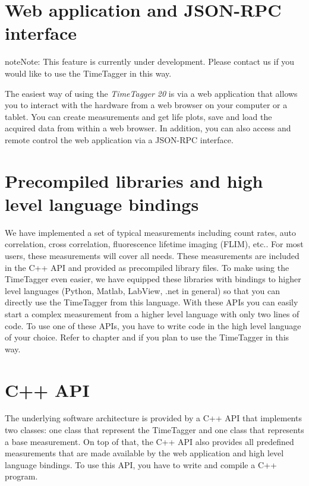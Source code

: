 \documentclass[letterpaper,10pt,english]{sphinxmanual}
\begin{document}
\section{Web application and JSON-RPC interface}
\label{sections/software:web-application-and-json-rpc-interface}
\begin{notice}{note}{Note:}
This feature is currently under development. Please contact us if you would like to use the TimeTagger in this way.
\end{notice}

The easiest way of using the \emph{TimeTagger 20} is via a web application
that allows you to interact with the hardware from a web browser on your computer
or a tablet. You can create measurements
and get life plots, save and load the acquired data from within a web browser.
In addition, you can also access and remote control the web application
via a JSON-RPC interface.


\section{Precompiled libraries and high level language bindings}
\label{sections/software:precompiled-libraries-and-high-level-language-bindings}
We have implemented a set of typical measurements including count rates, auto
correlation, cross correlation, fluorescence lifetime imaging (FLIM), etc..
For most users, these measurements
will cover all needs. These measurements are included in
the C++ API and provided as precompiled library files. To make using the
TimeTagger even easier, we have equipped these libraries with
bindings to higher level languages (Python, Matlab, LabView, .net in general) so that you can directly
use the TimeTagger from this language.
With these APIs you can easily start a complex
measurement from a higher level language with only two lines of code.
To use one of these APIs, you have to write code in the high
level language of your choice. Refer to chapter {\hyperref[sections/gettingStarted:quickstart]{}} and {\hyperref[sections/api:api]{}}
if you plan to use the TimeTagger in this way.


\section{C++ API}
\label{sections/software:c-api}
The underlying software architecture is provided by a C++ API that implements
two classes: one class that represent the TimeTagger and one class that
represents a base measurement. On top of that, the C++ API also provides
all predefined measurements that are made available by the web
application and high level language bindings. To use this API, you have to
write and compile a C++ program.
\end{document}
